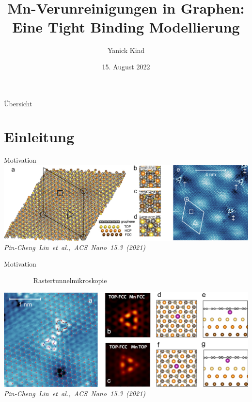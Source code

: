 \documentclass[aspectratio=1610, 9pt, xcolor=dvipsnames]{beamer}
\title{Mn-Verunreinigungen in Graphen: Eine
Tight Binding Modellierung}
\author[Y.~Kind]{Yanick Kind}
\institute[AG Anders]{AG Anders \\  Fakultät Physik}
\date{15. August 2022}
\begin{document}
\maketitle

\begin{frame}{Übersicht}
  \tableofcontents
\end{frame}

\section{Einleitung}
\begin{frame}{Motivation}
  \vspace*{1cm}
  \centering
  \includegraphics[width = \textwidth]{Plots/images_large_nn1c00139_0002.jpeg}
  \hspace*{15pt}\hbox{\scriptsize {\footnotesize\itshape Pin-Cheng Lin et al., \textit{ACS Nano 15.3 (2021)} }}
\end{frame}
  \begin{frame}{Motivation}
    \begin{flushleft}
      $\quad \quad \quad \quad$ Rastertunnelmikroskopie
    \end{flushleft}
    \centering
  \includegraphics[width = \textwidth]{Plots/images_large_nn1c00139_0003.jpeg}
  \hspace*{15pt}\hbox{\scriptsize {\footnotesize\itshape Pin-Cheng Lin et al., \textit{ACS Nano 15.3 (2021)} }}
\end{frame}
\end{document}
